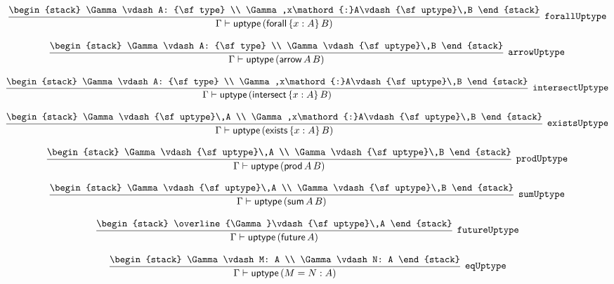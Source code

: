 \[
\infer[{\tt forallUptype}]{\Gamma \vdash {\sf uptype}\,({\sf forall}\,\{x : A\}\,B)}{
\begin{stack}
\Gamma \vdash A: {\sf type}
\\
\Gamma ,x\mathord{:}A\vdash {\sf uptype}\,B
\end{stack}}
\]

\[
\infer[{\tt arrowUptype}]{\Gamma \vdash {\sf uptype}\,({\sf arrow}\,A\,B)}{
\begin{stack}
\Gamma \vdash A: {\sf type}
\\
\Gamma \vdash {\sf uptype}\,B
\end{stack}}
\]

\[
\infer[{\tt intersectUptype}]{\Gamma \vdash {\sf uptype}\,({\sf intersect}\,\{x : A\}\,B)}{
\begin{stack}
\Gamma \vdash A: {\sf type}
\\
\Gamma ,x\mathord{:}A\vdash {\sf uptype}\,B
\end{stack}}
\]

\[
\infer[{\tt existsUptype}]{\Gamma \vdash {\sf uptype}\,({\sf exists}\,\{x : A\}\,B)}{
\begin{stack}
\Gamma \vdash {\sf uptype}\,A
\\
\Gamma ,x\mathord{:}A\vdash {\sf uptype}\,B
\end{stack}}
\]

\[
\infer[{\tt prodUptype}]{\Gamma \vdash {\sf uptype}\,({\sf prod}\,A\,B)}{
\begin{stack}
\Gamma \vdash {\sf uptype}\,A
\\
\Gamma \vdash {\sf uptype}\,B
\end{stack}}
\]

\[
\infer[{\tt sumUptype}]{\Gamma \vdash {\sf uptype}\,({\sf sum}\,A\,B)}{
\begin{stack}
\Gamma \vdash {\sf uptype}\,A
\\
\Gamma \vdash {\sf uptype}\,B
\end{stack}}
\]

\[
\infer[{\tt futureUptype}]{\Gamma \vdash {\sf uptype}\,({\sf future}\,A)}{
\begin{stack}
\overline{\Gamma}\vdash {\sf uptype}\,A
\end{stack}}
\]

\[
\infer[{\tt eqUptype}]{\Gamma \vdash {\sf uptype}\,(M= N: A)}{
\begin{stack}
\Gamma \vdash M: A
\\
\Gamma \vdash N: A
\end{stack}}
\]

